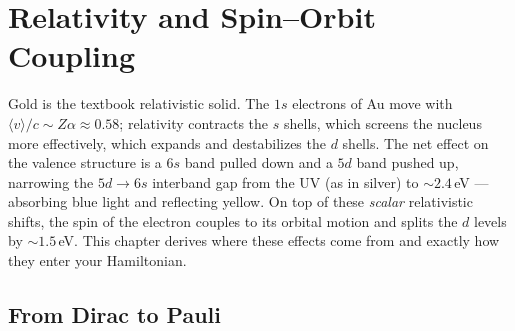 \chapter{Relativity and Spin--Orbit Coupling}
\label{ch:soc}

Gold is the textbook relativistic solid. The $1s$ electrons of Au move with
$\langle v \rangle / c \sim Z\alpha \approx 0.58$; relativity contracts the
$s$ shells, which screens the nucleus more effectively, which expands and
destabilizes the $d$ shells. The net effect on the valence structure is a
$6s$ band pulled down and a $5d$ band pushed up, narrowing the $5d \to 6s$
interband gap from the UV (as in silver) to $\sim 2.4$\,eV --- absorbing blue
light and reflecting yellow. On top of these \emph{scalar} relativistic
shifts, the spin of the electron couples to its orbital motion and splits the
$d$ levels by $\sim 1.5$\,eV. This chapter derives where these effects come
from and exactly how they enter your Hamiltonian.

\section{From Dirac to Pauli}

